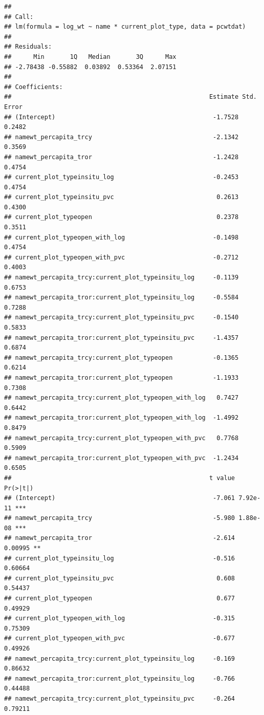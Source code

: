 \documentclass[
]{article}
\begin{document}
\begin{verbatim}
## 
## Call:
## lm(formula = log_wt ~ name * current_plot_type, data = pcwtdat)
## 
## Residuals:
##      Min       1Q   Median       3Q      Max 
## -2.78438 -0.55882  0.03892  0.53364  2.07151 
## 
## Coefficients:
##                                                      Estimate Std. Error
## (Intercept)                                           -1.7528     0.2482
## namewt_percapita_trcy                                 -2.1342     0.3569
## namewt_percapita_tror                                 -1.2428     0.4754
## current_plot_typeinsitu_log                           -0.2453     0.4754
## current_plot_typeinsitu_pvc                            0.2613     0.4300
## current_plot_typeopen                                  0.2378     0.3511
## current_plot_typeopen_with_log                        -0.1498     0.4754
## current_plot_typeopen_with_pvc                        -0.2712     0.4003
## namewt_percapita_trcy:current_plot_typeinsitu_log     -0.1139     0.6753
## namewt_percapita_tror:current_plot_typeinsitu_log     -0.5584     0.7288
## namewt_percapita_trcy:current_plot_typeinsitu_pvc     -0.1540     0.5833
## namewt_percapita_tror:current_plot_typeinsitu_pvc     -1.4357     0.6874
## namewt_percapita_trcy:current_plot_typeopen           -0.1365     0.6214
## namewt_percapita_tror:current_plot_typeopen           -1.1933     0.7308
## namewt_percapita_trcy:current_plot_typeopen_with_log   0.7427     0.6442
## namewt_percapita_tror:current_plot_typeopen_with_log  -1.4992     0.8479
## namewt_percapita_trcy:current_plot_typeopen_with_pvc   0.7768     0.5909
## namewt_percapita_tror:current_plot_typeopen_with_pvc  -1.2434     0.6505
##                                                      t value Pr(>|t|)    
## (Intercept)                                           -7.061 7.92e-11 ***
## namewt_percapita_trcy                                 -5.980 1.88e-08 ***
## namewt_percapita_tror                                 -2.614  0.00995 ** 
## current_plot_typeinsitu_log                           -0.516  0.60664    
## current_plot_typeinsitu_pvc                            0.608  0.54437    
## current_plot_typeopen                                  0.677  0.49929    
## current_plot_typeopen_with_log                        -0.315  0.75309    
## current_plot_typeopen_with_pvc                        -0.677  0.49926    
## namewt_percapita_trcy:current_plot_typeinsitu_log     -0.169  0.86632    
## namewt_percapita_tror:current_plot_typeinsitu_log     -0.766  0.44488    
## namewt_percapita_trcy:current_plot_typeinsitu_pvc     -0.264  0.79211    

\end{verbatim}
\end{document}
